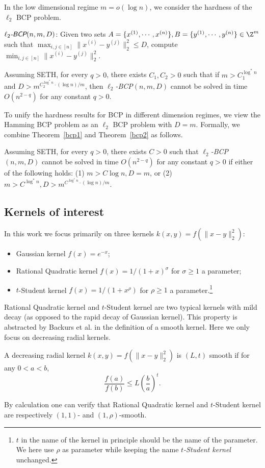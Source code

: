 In the low dimensional regime $m = o(\log n)$, we consider the hardness of the $\ell_2$ BCP problem.
\begin{problem}
$\ell_2\emph{\textsf{-BCP}}(n, m, D)$: Given two sets $A = \{x^{(1)}, \cdots, x^{(n)}\}, B = \{y^{(1)}, \cdots, y^{(n)}\} \in \Z^m$ such that $\max_{i, j \in [n]} \|x^{(i)} - y^{(j)}\|_2^2 \le D$, compute $\min_{i, j \in [n]} \|x^{(i)} - y^{(j)}\|_2^2$.
\end{problem}
\begin{theorem} \label{bcp2}
Assuming SETH, for every $q > 0$, there exists $C_1, C_2 > 0$ such that if $m > C_1^{\log^* n}$ and $D > m^{C_2^{\log^* n} \cdot (\log n)/m}$, then $\ell_2$\emph{\textsf{-BCP}}$(n, m, D)$ cannot be solved in time $O(n^{2-q})$ for any constant $q>0$.
\end{theorem}

To unify the hardness results for BCP in different dimension regimes, we view the Hamming BCP problem 
as an $\ell_2$ BCP problem with $D = m$. 
Formally, we combine Theorem~\ref{bcp1} and Theorem~\ref{bcp2} as follows.
\begin{theorem} \label{thm:mainbcp}
Assuming SETH, for every $q > 0$, there exists $C > 0$ such that $\ell_2$\emph{\textsf{-BCP}}$(n, m, D)$
cannot be solved in time $O(n^{2-q})$ for any constant $q>0$ if either of the following holds: (1) $m > C \log n, D = m$, or (2) $m > C^{\log^* n}, D > m^{C^{\log^* n} \cdot (\log n)/m}$.
\end{theorem}

\subsection{Kernels of interest}
In this work we focus primarily on three kernels $k(x, y) = f(\|x - y\|_2^2)$:
\begin{itemize}
\item Gaussian kernel $f(x) = e^{-x}$;
\item Rational Quadratic kernel $f(x) = 1/(1+x)^\sigma$ for $\sigma \ge 1$ a parameter;
\item $t$-Student kernel $f(x) = 1/(1+x^{\rho})$ for $\rho \ge 1$ a parameter.\footnote{$t$ in the name of the kernel in principle should be the name of the parameter. We here use $\rho$ as parameter while keeping the name \emph{$t$-Student kernel} unchanged.}
\end{itemize}
Rational Quadratic kernel and $t$-Student kernel are two typical kernels with mild decay (as opposed to the rapid decay of Gaussian kernel). This property is abstracted by Backurs et al. \cite{BCIS18} in the definition of a smooth kernel. Here we only focus on decreasing radial kernels.
\begin{definition}
A decreasing radial kernel $k(x, y) = f(\|x - y\|_2^2)$ is $(L, t)$ smooth if for any $0 < a < b$,
\[\frac{f(a)}{f(b)} \le L \left(\frac ba \right)^t.\]
\end{definition}
By calculation one can verify that Rational Quadratic kernel and $t$-Student kernel are respectively $(1, 1)$- and $(1, \rho)$-smooth.

